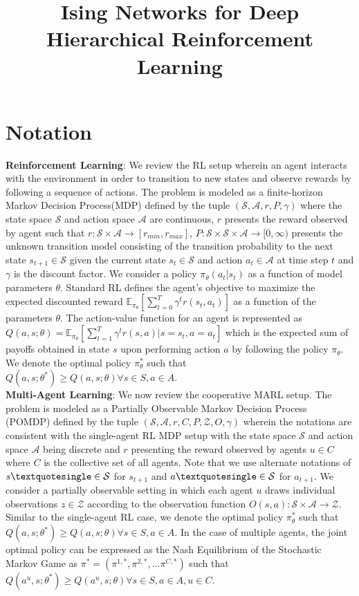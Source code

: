 \documentclass{article}
\title{Ising Networks for Deep Hierarchical Reinforcement Learning}
\author{ }
\date{ }
\begin{document}
\maketitle
\section{Notation}

\textbf{Reinforcement Learning}: We review the RL setup wherein an agent interacts with the environment in order to transition to new states and observe rewards by following a sequence of actions. The problem is modeled as a finite-horizon Markov Decision Process(MDP) \cite{sutton} defined by the tuple $(\mathcal{S},\mathcal{A},r,P,\gamma)$ where the state space $\mathcal{S}$ and action space $\mathcal{A}$ are continuous, $r$ presents the reward observed by agent such that $r: \mathcal{S} \times \mathcal{A} \rightarrow [r_{min},r_{max}]$, $P: \mathcal{S} \times \mathcal{S} \times \mathcal{A} \rightarrow [0,\infty)$ presents the unknown transition model consisting of the transition probability to the next state $s_{t+1} \in \mathcal{S}$ given the current state $s_{t} \in \mathcal{S}$ and action $a_{t} \in \mathcal{A}$ at time step $t$ and $\gamma$ is the discount factor. We consider a policy $\pi_{\theta}({a_{t}|s_{t}})$ as a function of model parameters $\theta$. Standard RL defines the agent's objective to maximize the expected discounted reward $\mathbb{E}_{\pi_{\theta}}[\sum_{t=0}^{T}\gamma^{t}r(s_{t},a_{t})]$ as a function of the parameters $\theta$. The action-value function for an agent is represented as $Q(a,s;\theta) = \mathbb{E}_{\pi_{\theta}}[\sum_{t=1}^{T}\gamma^{t}r(s,a)|s=s_{t},a=a_{t}]$ which is the expected sum of payoffs obtained in state $s$ upon performing action $a$ by following the policy $\pi_{\theta}$. We denote the optimal policy $\pi_{\theta}^{*}$ such that $Q(a,s;\theta^{*}) \geq Q(a,s;\theta) \forall s \in S, a \in A$.\\

\textbf{Multi-Agent Learning}: We now review the cooperative MARL setup. The problem is modeled as a Partially Observable Markov Decision Process (POMDP) \cite{sutton} defined by the tuple $(\mathcal{S},\mathcal{A},r,C,P,\mathcal{Z},O,\gamma)$ wherein the notations are consistent with the single-agent RL MDP setup with the state space $\mathcal{S}$ and action space $\mathcal{A}$ being discrete and $r$ presenting the reward observed by agents $u \in C$ where $C$ is the collective set of all agents. Note that we use alternate notations of  $s\textquotesingle \in \mathcal{S}$ for $s_{t+1}$ and $a\textquotesingle \in \mathcal{S}$ for $a_{t+1}$. We consider a partially observable setting in which each agent $u$ draws individual observations $z \in \mathcal{Z}$ according to the observation function $O(s,a): \mathcal{S} \times \mathcal{A} \rightarrow \mathcal{Z}$. Similar to the single-agent RL case, we denote the optimal policy $\pi_{\theta}^{*}$ such that $Q(a,s;\theta^{*}) \geq Q(a,s;\theta) \forall s \in S, a \in A$. In the case of multiple agents, the joint optimal policy can be expressed as the Nash Equilibrium \cite{nash} of the Stochastic Markov Game as $\pi^{*} = (\pi^{1,*},\pi^{2,*}, ...\pi^{C,*})$ such that $Q(a^{u},s;\theta^{*}) \geq Q(a^{u},s;\theta) \forall s \in S, a \in A, u \in C$.
\end{document}
